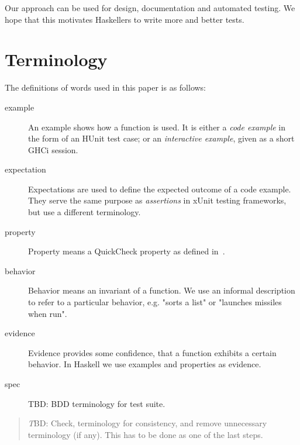 \documentclass[preprint]{sigplanconf}
\begin{document}
\noindent Our approach can be used for design, documentation and
automated testing.  We hope that this motivates Haskellers to write
more and better tests.

\section{Terminology}

The definitions of words used in this paper is as follows:

\begin{description}

\item[example]
    An example shows how a function is used.  It is either a \emph{code
    example} in the form of an HUnit test case; or an \emph{interactive
    example}, given as a short GHCi session.

\item[expectation]
    Expectations are used to define the expected outcome of a code
    example.  They serve the same purpose as \emph{assertions} in xUnit
    testing frameworks, but use a different terminology.

\item[property]
    Property means a QuickCheck property as defined in~\cite{quickcheck}.

\item[behavior]
    Behavior means an invariant of a function.  We use an informal description
    to refer to a particular behavior, e.g.  "sorts a list" or "launches
    missiles when run".

\item[evidence]
    Evidence provides some confidence, that a function exhibits a
    certain behavior.  In Haskell we use examples and properties as
    evidence.

\item[spec]
    TBD: BDD terminology for test suite.
\end{description}


\begin{quote}
    \emph TBD: Check, terminology for consistency, and remove
    unnecessary terminology (if any).  This has to be done as one of
    the last steps.
\end{quote}
\end{document}
